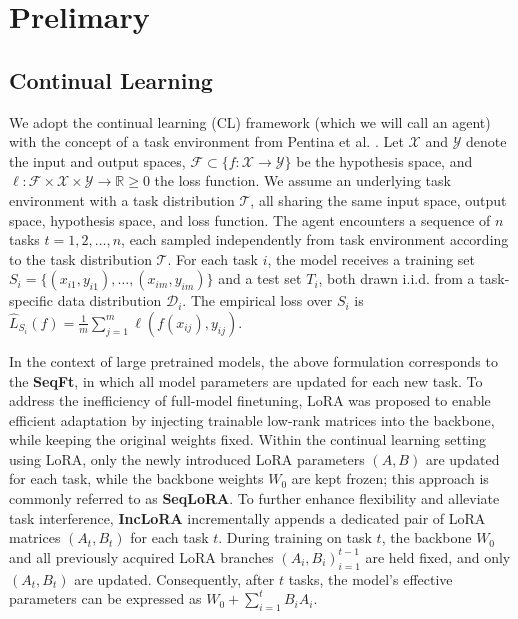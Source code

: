 \documentclass[letterpaper]{article} %
\begin{document}
\section{Prelimary}


\subsection{Continual Learning }
We adopt the continual learning (CL) framework (which we will call an agent) with the concept of a task environment from Pentina et al. . Let $\mathcal{X}$ and $\mathcal{Y}$ denote the input and output spaces, $\mathcal{F} \subset \{f : \mathcal{X} \to \mathcal{Y}\}$ be the hypothesis space, and $\ell: \mathcal{F} \times \mathcal{X} \times \mathcal{Y} \to \mathbb{R}{\geq 0}$ the loss function. We assume an underlying task environment with a task distribution $\mathcal{T}$, all sharing the same input space, output space, hypothesis space, and loss function. The agent encounters a sequence of $n$ tasks ${t=1, 2, \ldots, n}$, each sampled independently from task environment according to the task distribution $\mathcal{T}$. For each task $i$, the model receives a training set $S_i = \{(x_{i1}, y_{i1}), \ldots, (x_{im}, y_{im})\}$ and a test set $T_i$, both drawn i.i.d. from a task-specific data distribution $\mathcal{D}_i$. The empirical loss over
$S_i$ is $\widehat{L}_{S_i}(f) = \frac{1}{m}\sum_{j=1}^{m} \ell(f(x_{ij}), y_{ij})$.

In the context of large pretrained models, the above formulation corresponds to the \textbf{SeqFt}, in which all model parameters are updated for each new task. To address the inefficiency of full-model finetuning, LoRA was proposed to enable efficient adaptation by injecting trainable low-rank matrices into the backbone, while keeping the original weights fixed. Within the continual learning setting using LoRA, only the newly introduced LoRA parameters $(A, B)$ are updated for each task, while the backbone weights $W_0$ are kept frozen; this approach is commonly referred to as \textbf{SeqLoRA}. To further enhance flexibility and alleviate task interference, \textbf{IncLoRA} incrementally appends a dedicated pair of LoRA matrices $(A_t, B_t)$ for each task $t$. During training on task $t$, the backbone $W_0$ and all previously acquired LoRA branches ${(A_i, B_i)}_{i=1}^{t-1}$ are held fixed, and only $(A_t, B_t)$ are updated. Consequently, after $t$ tasks, the model’s effective parameters can be expressed as $W_0 + \sum_{i=1}^{t} B_i A_i$.
\end{document}
